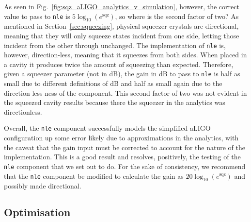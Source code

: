 \documentclass[aps,pra,superscriptaddress,reprint,nofootinbib]{revtex4-1}
\newcommand{\code}[1]{\texttt{#1}}
\begin{document}
As seen in Fig.~\ref{fig:sqz_aLIGO_analytics_v_simulation}, however, the correct value to pass to \code{nle} is $5 \log_{10}(e^\mathrm{sqz})$, so where is the second factor of two? As mentioned in Section~\ref{sec:squeezing}, physical squeezer crystals are directional, meaning that they will only squeeze states incident from one side, letting those incident from the other through unchanged. The implementation of \code{nle} is, however, direction-less, meaning that it squeezes from both sides. When placed in a cavity it produces twice the amount of squeezing than expected. Therefore, given a squeezer parameter (not in dB), the gain in dB to pass to \code{nle} is half as small due to different definitions of dB and half as small again due to the direction-less-ness of the component. This second factor of two was not evident in the squeezed cavity results because there the squeezer in the analytics was directionless.


Overall, the \code{nle} component successfully models the simplified aLIGO configuration up some error likely due to approximations in the analytics, with the caveat that the gain input must be corrected to account for the nature of the implementation. This is a good result and resolves, positively, the testing of the \code{nle} component that we set out to do. For the sake of consistency, we recommend that the \code{nle} component be modified to calculate the gain as $20 \log_{10}(e^\mathrm{sqz})$ and possibly made directional.


\subsection{Optimisation}
\end{document}
